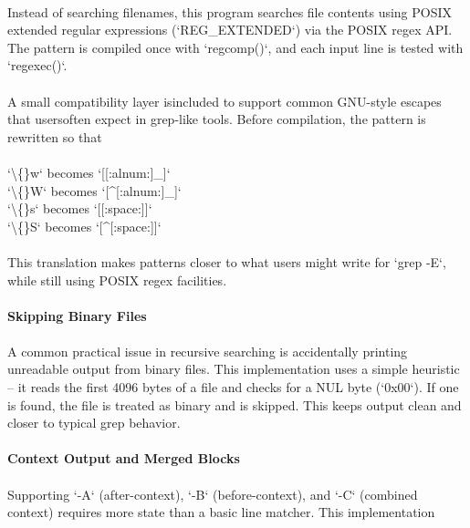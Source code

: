 \documentclass{article}
\begin{document}
\\
{\normalsize Instead of searching }{\normalsize filenames, this program searches file contents using POSIX extended regular expressions (`REG\_EXTENDED`) via the POSIX regex API. The pattern is compiled once with `}{\normalsize regcomp}{\normalsize (}{\normalsize )`, and each input line is tested with `}{\normalsize regexec}{\normalsize ()`.}\\
\\
{\normalsize A small compatibility layer is}{\normalsize  included to support common GNU-style escapes }{\normalsize that users}{\normalsize  often expect in grep-like tools. Before compilation, the pattern is rewritten so that}\\
\\
{\normalsize `\textbackslash\{\}w` becomes `[}{\normalsize [:}{\normalsize alnum}{\normalsize :]\_]`}\\
{\normalsize `\textbackslash\{\}W` becomes `[\textasciicircum{}}{\normalsize [:}{\normalsize alnum}{\normalsize :]\_]`}\\
{\normalsize `\textbackslash\{\}s` becomes `[}{\normalsize [:space}{\normalsize :]]`}\\
{\normalsize `\textbackslash\{\}S` becomes `[\textasciicircum{}}{\normalsize [:space}{\normalsize :]}{\normalsize ]`}\\
\\
{\normalsize This translation makes patterns closer to what users might write for `grep -E`, while still using POSIX regex facilities.}\\
\\
{\large \textbf{Skipping Binary Files}}\\
\\
{\normalsize A common practical issue in recursive searching is accidentally printing unreadable output from }{\normalsize binary files. This implementation uses a simple heuristic – it reads the first 4096 bytes of a file and checks for a NUL byte (`0x00`). If one is found, the file is treated as binary and is skipped. This keeps output clean and closer to typical grep behavi}{\normalsize or.}\\
\\
{\large \textbf{Context Output and Merged Blocks}}\\
\\
{\normalsize Supporting `-A` (after-context), `-B` (before-context), and `-C` (combined context) requires more state than a basic line matcher. This implementation}\\
\\
\end{document}
